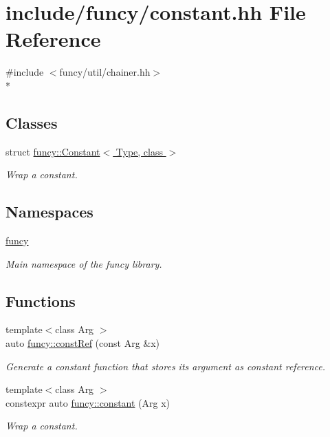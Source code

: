 \hypertarget{constant_8hh}{\section{include/funcy/constant.hh File Reference}
\label{constant_8hh}
}
{\ttfamily \#include $<$funcy/util/chainer.\-hh$>$}\\*
\subsection*{Classes}
\begin{DoxyCompactItemize}
\item 
struct \hyperlink{structfuncy_1_1Constant}{funcy\-::\-Constant$<$ Type, class $>$}
\begin{DoxyCompactList}\small\item\em Wrap a constant. \end{DoxyCompactList}\end{DoxyCompactItemize}
\subsection*{Namespaces}
\begin{DoxyCompactItemize}
\item 
\hyperlink{namespacefuncy}{funcy}
\begin{DoxyCompactList}\small\item\em Main namespace of the funcy library. \end{DoxyCompactList}\end{DoxyCompactItemize}
\subsection*{Functions}
\begin{DoxyCompactItemize}
\item 
{\footnotesize template$<$class Arg $>$ }\\auto \hyperlink{namespacefuncy_a5b53fb968a94a7c6535601fa15b1fc88}{funcy\-::const\-Ref} (const Arg \&x)
\begin{DoxyCompactList}\small\item\em Generate a constant function that stores its argument as constant reference. \end{DoxyCompactList}\item 
{\footnotesize template$<$class Arg $>$ }\\constexpr auto \hyperlink{namespacefuncy_a46d594fc5323b9427a530af323a9ca71}{funcy\-::constant} (Arg x)
\begin{DoxyCompactList}\small\item\em Wrap a constant. \end{DoxyCompactList}\end{DoxyCompactItemize}
